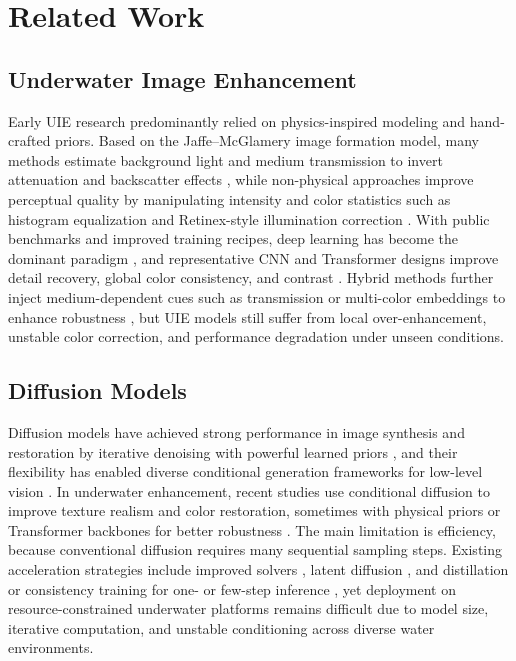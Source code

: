 \section{Related Work}

\subsection{Underwater Image Enhancement}
Early UIE research predominantly relied on physics-inspired modeling and hand-crafted priors. Based on the Jaffe--McGlamery image formation model, many methods estimate background light and medium transmission to invert attenuation and backscatter effects \cite{r12,r4,r14}, while non-physical approaches improve perceptual quality by manipulating intensity and color statistics such as histogram equalization and Retinex-style illumination correction \cite{r15,r17}. With public benchmarks and improved training recipes, deep learning has become the dominant paradigm \cite{r18,r6}, and representative CNN and Transformer designs improve detail recovery, global color consistency, and contrast \cite{r0,r7}. Hybrid methods further inject medium-dependent cues such as transmission or multi-color embeddings to enhance robustness \cite{r42,r40,r41}, but UIE models still suffer from local over-enhancement, unstable color correction, and performance degradation under unseen conditions.

\subsection{Diffusion Models}
Diffusion models have achieved strong performance in image synthesis and restoration by iterative denoising with powerful learned priors \cite{r20,r52,r21}, and their flexibility has enabled diverse conditional generation frameworks for low-level vision \cite{r22}. In underwater enhancement, recent studies use conditional diffusion to improve texture realism and color restoration, sometimes with physical priors or Transformer backbones for better robustness \cite{r9,r24,r8,r10}. The main limitation is efficiency, because conventional diffusion requires many sequential sampling steps. Existing acceleration strategies include improved solvers \cite{r43,r44}, latent diffusion \cite{r47}, and distillation or consistency training for one- or few-step inference \cite{r45,r46,r48}, yet deployment on resource-constrained underwater platforms remains difficult due to model size, iterative computation, and unstable conditioning across diverse water environments.

